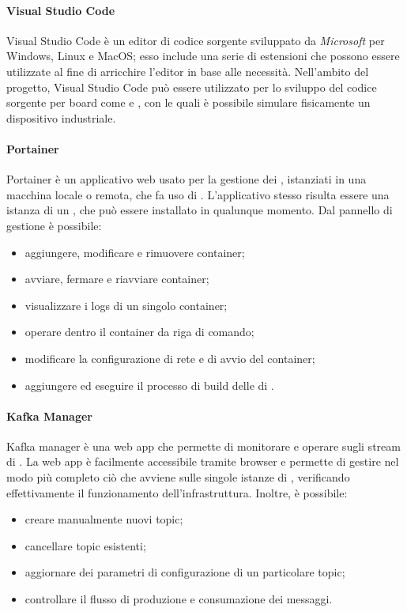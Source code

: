 				\paragraph{Visual Studio Code} 
					Visual Studio Code è un editor di codice sorgente sviluppato da \textit{Microsoft} per Windows, Linux e MacOS; esso include una serie di estensioni che possono essere utilizzate al fine di arricchire l'editor in base alle necessità.
					\newline
					Nell'ambito del progetto, Visual Studio Code può essere utilizzato per lo sviluppo del codice sorgente per board come  e , con le quali è possibile simulare fisicamente un dispositivo industriale.
				
				\paragraph{Portainer}
					Portainer è un applicativo web usato per la gestione dei , istanziati in una macchina locale o remota, che fa uso di .
					\newline
					L'applicativo stesso risulta essere una istanza di un , che può essere installato in qualunque momento. Dal pannello di gestione è possibile:
					\begin{itemize}
						\item aggiungere, modificare e rimuovere container;
						\item avviare, fermare e riavviare container;
						\item visualizzare i logs di un singolo container;
						\item operare dentro il container da riga di comando;
						\item modificare la configurazione di rete e di avvio del container;
						\item aggiungere ed eseguire il processo di build delle  di . 
					\end{itemize}

				\paragraph{Kafka Manager}
					Kafka manager è una web app che permette di monitorare e operare sugli stream di .
					\newline
					La web app è facilmente accessibile tramite browser e permette di gestire nel modo più completo ciò che avviene sulle singole istanze di , verificando effettivamente il funzionamento dell'infrastruttura. Inoltre, è possibile:
					\begin{itemize}
					 	\item creare manualmente nuovi topic;
					 	\item cancellare topic esistenti;
					 	\item aggiornare dei parametri di configurazione di un particolare topic;
					 	\item controllare il flusso di produzione e consumazione dei messaggi.
					 \end{itemize} 
				
